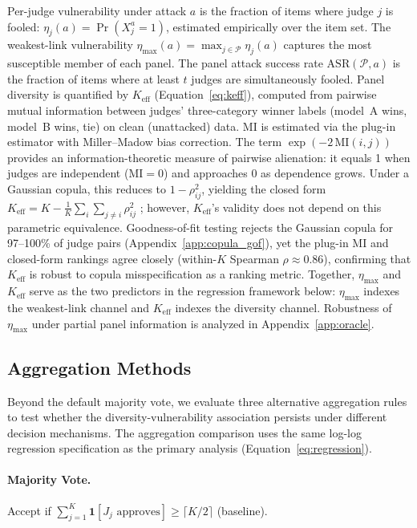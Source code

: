 Per-judge vulnerability under attack $a$ is the fraction of items where judge $j$ is fooled: $\eta_j(a) = \Pr(X_j^a {=} 1)$, estimated empirically over the item set. The weakest-link vulnerability $\eta_{\max}(a) = \max_{j \in \mathcal{P}} \eta_j(a)$ captures the most susceptible member of each panel. The panel attack success rate $\mathrm{ASR}(\mathcal{P}, a)$ is the fraction of items where at least $t$ judges are simultaneously fooled. Panel diversity is quantified by $K_{\mathrm{eff}}$ (Equation~\ref{eq:keff}), computed from pairwise mutual information between judges' three-category winner labels (model~A wins, model~B wins, tie) on clean (unattacked) data. MI is estimated via the plug-in estimator with Miller--Madow bias correction. The term $\exp(-2\,\mathrm{MI}(i,j))$ provides an information-theoretic measure of pairwise alienation: it equals 1 when judges are independent ($\mathrm{MI}{=}0$) and approaches 0 as dependence grows. Under a Gaussian copula, this reduces to $1 - \rho_{ij}^2$, yielding the closed form $K_{\mathrm{eff}} = K - \frac{1}{K}\sum_{i}\sum_{j \neq i} \rho_{ij}^2$ \citep{nelsen2006copulas}; however, $K_{\mathrm{eff}}$'s validity does not depend on this parametric equivalence. Goodness-of-fit testing rejects the Gaussian copula for 97--100\% of judge pairs (Appendix~\ref{app:copula_gof}), yet the plug-in MI and closed-form rankings agree closely (within-$K$ Spearman $\rho{\approx}0.86$), confirming that $K_{\mathrm{eff}}$ is robust to copula misspecification as a ranking metric. Together, $\eta_{\max}$ and $K_{\mathrm{eff}}$ serve as the two predictors in the regression framework below: $\eta_{\max}$ indexes the weakest-link channel and $K_{\mathrm{eff}}$ indexes the diversity channel. Robustness of $\eta_{\max}$ under partial panel information is analyzed in Appendix~\ref{app:oracle}.

\subsection{Aggregation Methods}

Beyond the default majority vote, we evaluate three alternative aggregation rules to test whether the diversity-vulnerability association persists under different decision mechanisms. The aggregation comparison uses the same log-log regression specification as the primary analysis (Equation~\ref{eq:regression}).

\paragraph{Majority Vote.} Accept if $\sum_{j=1}^K \mathbf{1}[J_j \text{ approves}] \geq \lceil K/2 \rceil$ (baseline).

